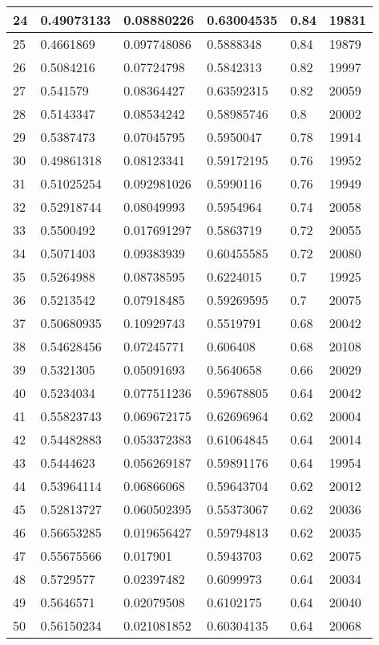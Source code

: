 \begin{longtable}{|l|l|l|l|l|l|}
24 & 0.49073133 & 0.08880226 & 0.63004535 & 0.84 & 19831 \\ \hline 
25 & 0.4661869 & 0.097748086 & 0.5888348 & 0.84 & 19879 \\ \hline 
26 & 0.5084216 & 0.07724798 & 0.5842313 & 0.82 & 19997 \\ \hline 
27 & 0.541579 & 0.08364427 & 0.63592315 & 0.82 & 20059 \\ \hline 
28 & 0.5143347 & 0.08534242 & 0.58985746 & 0.8 & 20002 \\ \hline 
29 & 0.5387473 & 0.07045795 & 0.5950047 & 0.78 & 19914 \\ \hline 
30 & 0.49861318 & 0.08123341 & 0.59172195 & 0.76 & 19952 \\ \hline 
31 & 0.51025254 & 0.092981026 & 0.5990116 & 0.76 & 19949 \\ \hline 
32 & 0.52918744 & 0.08049993 & 0.5954964 & 0.74 & 20058 \\ \hline 
33 & 0.5500492 & 0.017691297 & 0.5863719 & 0.72 & 20055 \\ \hline 
34 & 0.5071403 & 0.09383939 & 0.60455585 & 0.72 & 20080 \\ \hline 
35 & 0.5264988 & 0.08738595 & 0.6224015 & 0.7 & 19925 \\ \hline 
36 & 0.5213542 & 0.07918485 & 0.59269595 & 0.7 & 20075 \\ \hline 
37 & 0.50680935 & 0.10929743 & 0.5519791 & 0.68 & 20042 \\ \hline 
38 & 0.54628456 & 0.07245771 & 0.606408 & 0.68 & 20108 \\ \hline 
39 & 0.5321305 & 0.05091693 & 0.5640658 & 0.66 & 20029 \\ \hline 
40 & 0.5234034 & 0.077511236 & 0.59678805 & 0.64 & 20042 \\ \hline 
41 & 0.55823743 & 0.069672175 & 0.62696964 & 0.62 & 20004 \\ \hline 
42 & 0.54482883 & 0.053372383 & 0.61064845 & 0.64 & 20014 \\ \hline 
43 & 0.5444623 & 0.056269187 & 0.59891176 & 0.64 & 19954 \\ \hline 
44 & 0.53964114 & 0.06866068 & 0.59643704 & 0.62 & 20012 \\ \hline 
45 & 0.52813727 & 0.060502395 & 0.55373067 & 0.62 & 20036 \\ \hline 
46 & 0.56653285 & 0.019656427 & 0.59794813 & 0.62 & 20035 \\ \hline 
47 & 0.55675566 & 0.017901 & 0.5943703 & 0.62 & 20075 \\ \hline 
48 & 0.5729577 & 0.02397482 & 0.6099973 & 0.64 & 20034 \\ \hline 
49 & 0.5646571 & 0.02079508 & 0.6102175 & 0.64 & 20040 \\ \hline 
50 & 0.56150234 & 0.021081852 & 0.60304135 & 0.64 & 20068 \\ \hline 
\end{longtable}